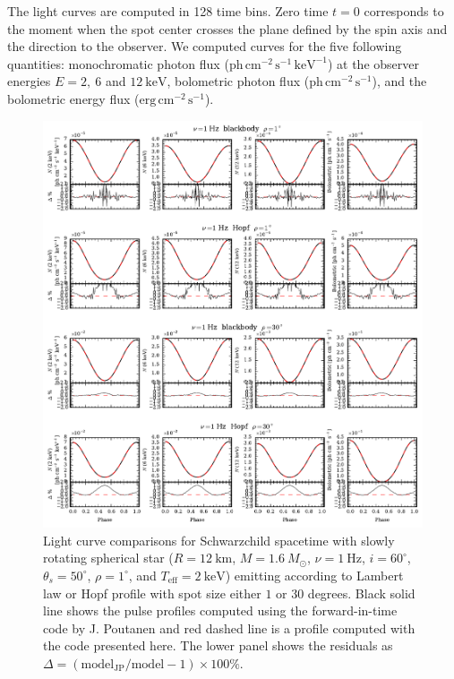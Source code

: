 \documentclass[iop, usenatbib]{emulateapj}
\newcommand{\Msun}{\ensuremath{M_{\odot}}}
\begin{document}
The light curves are computed in 128 time bins.  Zero time $t = 0$
corresponds to the moment when the spot center crosses the plane
defined by the spin axis and the direction to the observer.  
We computed curves for the five following quantities:
monochromatic photon flux
($\mathrm{ph}\,\mathrm{cm}^{-2}\,\mathrm{s}^{-1}\,\mathrm{keV}^{-1}$) at
the observer energies $E = 2,~6$ and $12~\mathrm{keV}$, bolometric
photon flux ($\mathrm{ph}\,\mathrm{cm}^{-2}\,\mathrm{s}^{-1}$), and the
bolometric energy flux
($\mathrm{erg}\,\mathrm{cm}^{-2}\,\mathrm{s}^{-1}$).


\begin{figure}
\centering
\includegraphics[width=18cm]{figs/fig2a.pdf}
\caption{\label{fig:sch_comp1}
  Light curve comparisons for Schwarzchild spacetime with slowly rotating spherical star ($R = 12~\mathrm{km}$, $M = 1.6~\Msun$, $\nu = 1~\mathrm{Hz}$, $i = 60^{\circ}$, $\theta_s = 50^{\circ}$, $\rho = 1^{\circ}$, and $T_{\mathrm{eff}} = 2~\mathrm{keV}$) emitting according to Lambert law or Hopf profile with spot size either $1$ or $30$ degrees.
  Black solid line shows the pulse profiles computed using the forward-in-time code by J. Poutanen and red dashed line is a profile computed with the code presented here.
  The lower panel shows the residuals as $\Delta = (\mathrm{model_{JP}}/\mathrm{model} -1) \times 100\%$.
}
\end{figure}
\end{document}
